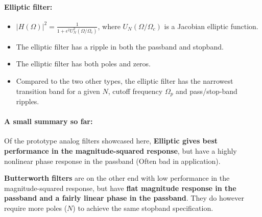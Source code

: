 \documentclass{article}
\begin{document}
\paragraph{Elliptic filter:}
\begin{itemize}
    \item $|H(\Omega)|^2 = \frac{1}{1 + \epsilon^2 U_N^2 (\Omega / \Omega_c ) }$, where $U_N(\Omega / \Omega_c)$ is a Jacobian elliptic function.
    \item The elliptic filter has a ripple in both the passband and stopband.
    \item The elliptic filter has both poles and zeros.
    \item Compared to the two other types, the elliptic filter has the narrowest transition band for a given $N$, cutoff frequency $\Omega_p$ and pass/stop-band ripples.
\end{itemize}

\paragraph{A small summary so far:}
Of the prototype analog filters showcased here, \textbf{Elliptic gives best performance in the magnitude-squared response}, but have a highly nonlinear phase response in the passband (Often bad in application). 

\textbf{Butterworth filters} are on the other end with low performance in the magnitude-squared response, but have \textbf{flat magnitude response in the passband and a fairly linear phase in the passband}. They do however require more poles ($N$) to achieve the same stopband specification.
\end{document}

